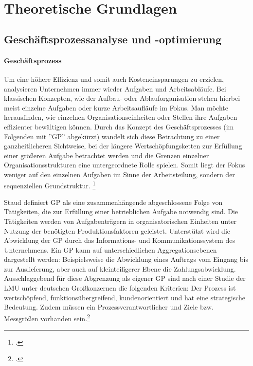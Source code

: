 \chapter{Theoretische Grundlagen}


\section{Geschäftsprozessanalyse und -optimierung}

\subsubsection{Geschäftsprozess}\label{sec:Kapitel211}

Um eine höhere Effizienz und somit auch Kosteneinsparungen  zu erzielen, analysieren Unternehmen immer wieder Aufgaben und Arbeitsabläufe. Bei klassischen Konzepten, wie der Aufbau- oder Ablauforganisation stehen hierbei meist einzelne Aufgaben oder kurze Arbeitsaufläufe im Fokus. Man möchte herausfinden, wie einzelnen Organisationseinheiten oder Stellen ihre Aufgaben effizienter bewältigen können. Durch das Konzept des Geschäftsprozesses (im Folgenden mit ''GP'' abgekürzt) wandelt sich diese Betrachtung zu einer ganzheitlicheren Sichtweise, bei der längere Wertschöpfungsketten zur Erfüllung einer grö\ss eren Aufgabe betrachtet werden und die Grenzen einzelner Organisationsstrukturen eine untergeordnete Rolle spielen. Somit liegt der Fokus weniger auf den einzelnen Aufgaben im Sinne der Arbeitsteilung, sondern der sequenziellen Grundstruktur. \footcite[Vgl.][S. 5]{theorie_staud_geschäftsprozessanalyse_2006}

Staud definiert GP als eine zusammenhängende abgeschlossene Folge von Tätigkeiten, die zur Erfüllung einer betrieblichen Aufgabe notwendig sind. Die Tätigkeiten werden von Aufgabenträgern in organisatorischen Einheiten unter Nutzung der benötigten Produktionsfaktoren geleistet. Unterstützt wird die Abwicklung der GP durch das Informations- und Kommunikationssystem des Unternehmens. \parencite[Vgl.][S. 9]{theorie_staud_geschäftsprozessanalyse_2006} Ein GP kann auf unterschiedlichen Aggregationsebenen dargestellt werden: Beispielsweise die Abwicklung eines Auftrags vom Eingang bis zur Auslieferung, aber auch auf kleinteiligerer Ebene die Zahlungsabwicklung. Ausschlaggebend für diese Abgrenzung als eigener GP sind nach einer Studie der LMU unter deutschen Gro\ss konzernen die folgenden Kriterien: Der Prozess ist wertschöpfend, funktionsübergreifend, kundenorientiert und hat eine strategische Bedeutung. Zudem müssen ein Prozessverantwortlicher und Ziele bzw. Messgrö\ss en vorhanden sein.\footcite[Vgl.][S. 19]{theorie_koch_studie_kriterien_geschäftsprozess_2003} 

